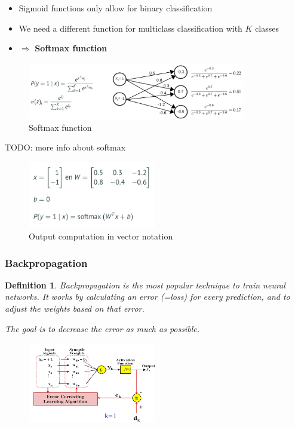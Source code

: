 \documentclass{article}
\newtheorem{theorem}{Definition}[section]
\begin{document}
\begin{itemize}
    \item Sigmoid functions only allow for binary classification 
    \item We need a different function for multiclass classification with $K$ classes
    \item $\Rightarrow$ \textbf{Softmax function}
\end{itemize}

\begin{figure}[H]
    \centering
    \includegraphics[width=0.85\textwidth]{img/softmax.png}
    \caption{Softmax function}
\end{figure}

TODO: more info about softmax

\begin{figure}[H]
    \centering
    \includegraphics[width=0.5\textwidth]{img/softmax2.png}
    \caption{Output computation in vector notation}
\end{figure}


\subsubsection{Backpropagation}

\begin{theorem}
    Backpropagation is the most popular technique to train neural networks.
    It works by calculating an error (=loss) for every prediction, and to adjust the weights based on that error.
    
    The goal is to decrease the error as much as possible.
\end{theorem}

\begin{figure}[H]
    \centering
    \includegraphics[width=0.5\textwidth]{img/backpropagation.png}
    \caption{}
\end{figure}
\end{document}
